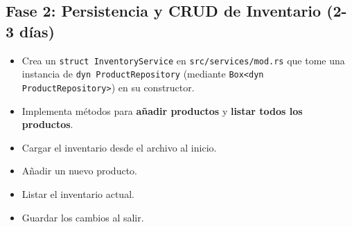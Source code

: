 \documentclass{article}
\begin{document}
	\subsection{Fase 2: Persistencia y CRUD de Inventario (2-3 días)}
		\begin{itemize}
			\item Crea un \texttt{struct InventoryService} en \texttt{src/services/mod.rs} que tome una instancia de \texttt{dyn ProductRepository} (mediante \texttt{Box<dyn ProductRepository>}) en su constructor.
			\item Implementa métodos para \textbf{añadir productos} y \textbf{listar todos los productos}.
		\end{itemize}
		\begin{itemize}
			\item Cargar el inventario desde el archivo al inicio.
			\item Añadir un nuevo producto.
			\item Listar el inventario actual.
			\item Guardar los cambios al salir.
		\end{itemize}
	
\end{document}
